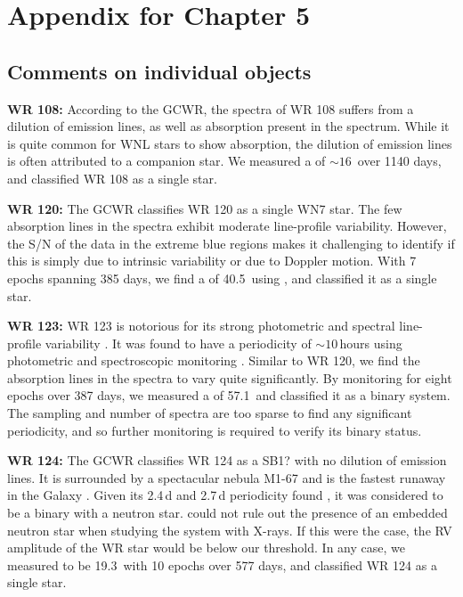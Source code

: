 \chapter{Appendix for Chapter 5}

\section{Comments on individual objects}\label{apdx:comments}
\textbf{WR 108:} According to the GCWR, the spectra of WR 108 suffers from a dilution of emission lines, as well as absorption present in the spectrum. While it is quite common for WNL stars to show absorption, the dilution of emission lines is often attributed to a companion star. We measured a \DelRV{} of ${\sim}16\,$\kms{} over 1140 days, and classified WR 108 as a single star. 

\textbf{WR 120:} The GCWR classifies WR 120 as a single WN7 star. The few absorption lines in the spectra exhibit moderate line-profile variability. However, the S/N of the data in the extreme blue regions makes it challenging to identify if this is simply due to intrinsic variability or due to Doppler motion. With 7 epochs spanning 385 days, we find a \DelRV{} of 40.5\,\kms{} using \niii{}, and classified it as a single star. 

\textbf{WR 123:} WR 123 is notorious for its strong photometric and spectral line-profile variability \citep{marchenko_time-frequency_1998}. It was found to have a periodicity of ${\sim}10\,$hours using photometric and spectroscopic monitoring \citep{lefevre_oscillations_2005,dorfi_most_2006,chene_10-h_2011}. Similar to WR 120, we find the absorption lines in the spectra to vary quite significantly. By monitoring \NVblue{} for eight epochs over 387 days, we measured a \DelRV{} of 57.1\,\kms{} and classified it as a binary system. The sampling and number of spectra are too sparse to find any significant periodicity, and so further monitoring is required to verify its binary status.

\textbf{WR 124:} The GCWR classifies WR 124 as a SB1? with no dilution of emission lines. It is surrounded by a spectacular nebula M1-67 and is the fastest runaway in the Galaxy \citep{moffat_fastest_1982}. Given its 2.4\,d and 2.7\,d periodicity found \citep{moffat_fastest_1982,moffat_photometric_1986}, it was considered to be a binary with a neutron star. \citet{toala_apparent_2018} could not rule out the presence of an embedded neutron star when studying the system with X-rays. If this were the case, the RV amplitude of the WR star would be below our threshold. In any case, we measured \DelRV{} to be 19.3\,\kms{} with 10 epochs over 577 days, and classified WR 124 as a single star.  

